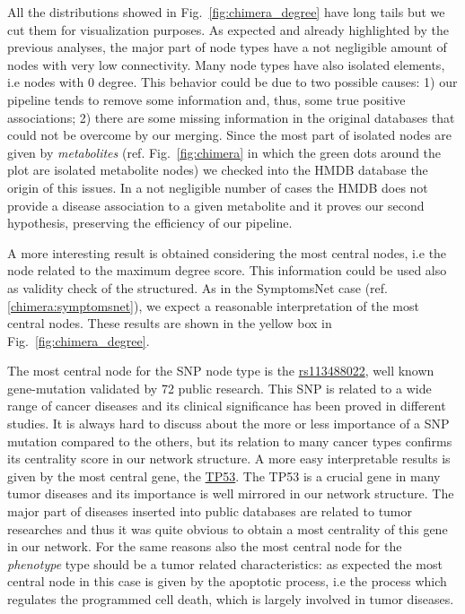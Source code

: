 \documentclass{standalone}
\begin{document}
All the distributions showed in Fig.~\ref{fig:chimera_degree} have long tails but we cut them for visualization purposes.
As expected and already highlighted by the previous analyses, the major part of node types have a not negligible amount of nodes with very low connectivity.
Many node types have also isolated elements, i.e nodes with $0$ degree.
This behavior could be due to two possible causes: 1) our pipeline tends to remove some information and, thus, some true positive associations; 2) there are some missing information in the original databases that could not be overcome by our merging.
Since the most part of isolated nodes are given by \emph{metabolites} (ref. Fig.~\ref{fig:chimera} in which the green dots around the plot are isolated metabolite nodes) we checked into the HMDB database the origin of this issues.
In a not negligible number of cases the HMDB does not provide a disease association to a given metabolite and it proves our second hypothesis, preserving the efficiency of our pipeline.

A more interesting result is obtained considering the most central nodes, i.e the node related to the maximum degree score.
This information could be used also as validity check of the structured.
As in the \textsf{SymptomsNet} case (ref. \ref{chimera:symptomsnet}), we expect a reasonable interpretation of the most central nodes.
These results are shown in the yellow box in Fig.~\ref{fig:chimera_degree}.

The most central node for the SNP node type is the \href{https://www.ncbi.nlm.nih.gov/snp/rs113488022}{\textsf{rs113488022}}, well known gene-mutation validated by 72 public research.
This SNP is related to a wide range of cancer diseases and its clinical significance has been proved in different studies.
It is always hard to discuss about the more or less importance of a SNP mutation compared to the others, but its relation to many cancer types confirms its centrality score in our network structure.
A more easy interpretable results is given by the most central gene, the \href{https://ghr.nlm.nih.gov/gene/TP53}{\textsf{TP53}}.
The \textsf{TP53} is a crucial gene in many tumor diseases and its importance is well mirrored in our network structure.
The major part of diseases inserted into public databases are related to tumor researches and thus it was quite obvious to obtain a most centrality of this gene in our network.
For the same reasons also the most central node for the \emph{phenotype} type should be a tumor related characteristics: as expected the most central node in this case is given by the \textsf{apoptotic process}, i.e the process which regulates the programmed cell death, which is largely involved in tumor diseases.
\end{document}
